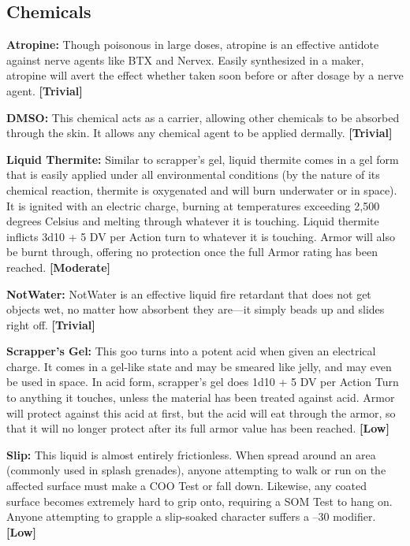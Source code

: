 \subsection{Chemicals}

\textbf{Atropine:} Though poisonous in large doses, atropine 
is an effective antidote against nerve agents like BTX
and Nervex. Easily synthesized in a maker, atropine 
will avert the effect whether taken soon before or after 
dosage by a nerve agent. \textbf{[Trivial]}

\textbf{DMSO:} This chemical acts as a carrier, allowing
other chemicals to be absorbed through the
skin. It allows any chemical agent to be applied 
dermally. \textbf{[Trivial]}

\textbf{Liquid Thermite:} Similar to scrapper's gel, liquid 
thermite comes in a gel form that is easily applied 
under all environmental conditions (by the nature 
of its chemical reaction, thermite is oxygenated and 
will burn underwater or in space). It is ignited with 
an electric charge, burning at temperatures exceeding 
2,500 degrees Celsius and melting through whatever 
it is touching. Liquid thermite inflicts 3d10 + 5 DV per 
Action turn to whatever it is touching. Armor will also 
be burnt through, offering no protection once the full 
Armor rating has been reached. \textbf{[Moderate]}

\textbf{NotWater:} NotWater is an effective liquid fire retardant
that does not get objects wet, no matter how
absorbent they are—it simply beads up and slides 
right off. \textbf{[Trivial]}

\textbf{Scrapper's Gel:} This goo turns into a potent acid 
when given an electrical charge. It comes in a gel-like 
state and may be smeared like jelly, and may even be 
used in space. In acid form, scrapper's gel does 1d10 
+ 5 DV per Action Turn to anything it touches, unless 
the material has been treated against acid. Armor will 
protect against this acid at first, but the acid will eat 
through the armor, so that it will no longer protect 
after its full armor value has been reached. \textbf{[Low]}

\textbf{Slip:} This liquid is almost entirely frictionless. When 
spread around an area (commonly used in splash 
grenades), anyone attempting to walk or run on the 
affected surface must make a COO Test or fall down. 
Likewise, any coated surface becomes extremely 
hard to grip onto, requiring a SOM Test to hang on. 
Anyone attempting to grapple a slip-soaked character 
suffers a –30 modifier. \textbf{[Low]}

